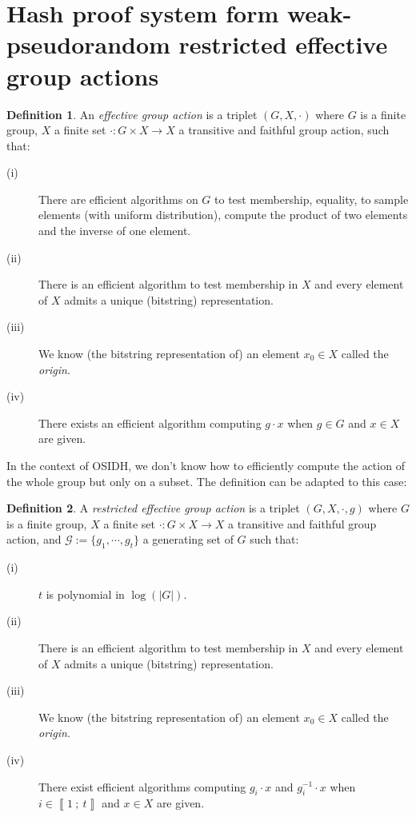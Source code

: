 \documentclass[a4paper,10pt,notitlepage]{report}
\theoremstyle{definition}
\newtheorem{Definition}{Definition}[chapter]
\theoremstyle{plain}
\theoremstyle{definition}
\newcommand{\m}[1]{\mathcal{#1}}
\renewcommand{\i}[2]{\left\llbracket #1~;~#2\right\rrbracket}
\renewcommand{\(}{\left(}
\renewcommand{\)}{\right)}
\begin{document}
\section{Hash proof system form weak-pseudorandom restricted effective group actions}

\begin{Definition}\cite[Definition 2]{DeFeo1}
An \emph{effective group action} is a triplet $(G,X,\cdot)$ where $G$ is a finite group, $X$ a finite set $\cdot : G\times X\longrightarrow X$ a transitive and faithful group action, such that:
\begin{description}
\item[(i)] There are efficient algorithms on $G$ to test membership, equality,  to sample elements (with uniform distribution), compute the product of two elements and the inverse of one element.
\item[(ii)] There is an efficient algorithm to test membership in $X$ and every element of $X$ admits a unique (bitstring) representation.
\item[(iii)] We know (the bitstring representation of) an element $x_0\in X$ called the \emph{origin}.
\item[(iv)] There exists an efficient algorithm computing $g\cdot x$ when $g\in G$ and $x\in X$ are given.
\end{description}
\end{Definition}

In the context of OSIDH, we don't know how to efficiently compute the action of the whole group but only on a subset. The definition can be adapted to this case:

\begin{Definition}\cite[Definition 6]{DeFeo1}
A \emph{restricted effective group action} is a triplet $(G,X,\cdot,g)$ where $G$ is a finite group, $X$ a finite set $\cdot : G\times X\longrightarrow X$ a transitive and faithful group action, and $\m{G}:=\{g_1,\cdots, g_t\}$ a generating set of $G$ such that:
\begin{description}
\item[(i)] $t$ is polynomial in $\log(|G|)$.
\item[(ii)] There is an efficient algorithm to test membership in $X$ and every element of $X$ admits a unique (bitstring) representation.
\item[(iii)] We know (the bitstring representation of) an element $x_0\in X$ called the \emph{origin}.
\item[(iv)] There exist efficient algorithms computing $g_i\cdot x$ and $g_i^{-1}\cdot x$ when $i\in\i{1}{t}$ and $x\in X$ are given.
\end{description}
\end{Definition}
\end{document}
